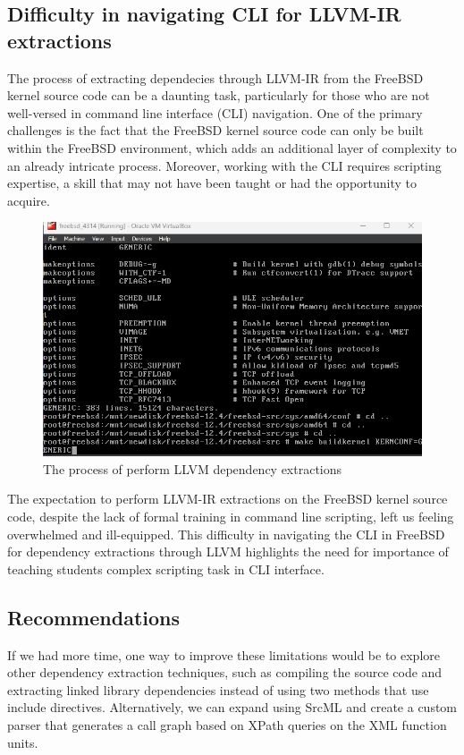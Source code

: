 \documentclass[12pt, dvipsnames, a4paper]{article}
\begin{document}
\subsection{Difficulty in navigating CLI for LLVM-IR extractions}
The process of extracting dependecies through LLVM-IR from the FreeBSD kernel source code can be a daunting task, particularly for those who are not well-versed in command line interface (CLI) navigation. One of the primary challenges is the fact that the FreeBSD kernel source code can only be built within the FreeBSD environment, which adds an additional layer of complexity to an already intricate process. Moreover, working with the CLI requires scripting expertise, a skill that may not have been taught or had the opportunity to acquire.
\begin{figure}[H]
	\center
	\includegraphics[width = 450pt]{assets/make_kern.png}
	\caption{The process of perform LLVM dependency extractions}
\end{figure}
The expectation to perform LLVM-IR extractions on the FreeBSD kernel source code, despite the lack of formal training in command line scripting, left us feeling overwhelmed and ill-equipped. This difficulty in navigating the CLI in FreeBSD for dependency extractions through LLVM highlights the need for importance of teaching students complex scripting task in CLI interface.

\subsection{Recommendations}
If we had more time, one way to improve these limitations would be to explore other dependency extraction techniques, such as compiling the source code and extracting linked library dependencies instead of using two methods that use include directives. Alternatively, we can expand using SrcML and create a custom parser that generates a call graph based on XPath queries on the XML function units.
\clearpage
\end{document}
